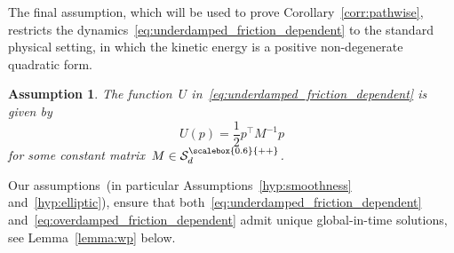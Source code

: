 \documentclass[10pt]{article}
\newcommand{\cSpd}{\mathcal{S}_d^{\scalebox{0.6}{++}}}
\newcommand{\1}{\mathbbm 1}
\newtheorem{hypothesis}{Assumption}
\begin{document}
    The final assumption, which will be used to prove Corollary~\ref{corr:pathwise}, restricts the dynamics~\eqref{eq:underdamped_friction_dependent} to the standard physical setting, in which the kinetic energy is a positive non-degenerate quadratic form.
    \begin{hypothesis}
        \label{hyp:phys_kinetic}
        The function~$U$ in~\eqref{eq:underdamped_friction_dependent} is given by
        \begin{equation}
            \label{eq:phys_kinetic}
            U(p) = \frac12p^\top M^{-1}p
        \end{equation}
        for some constant matrix~$M\in\cSpd$.
    \end{hypothesis}

Our assumptions~(in particular Assumptions~\ref{hyp:smoothness} and~\ref{hyp:elliptic}), ensure that both~\eqref{eq:underdamped_friction_dependent} and~\eqref{eq:overdamped_friction_dependent} admit unique global-in-time solutions, see Lemma~\ref{lemma:wp} below.
\end{document}
